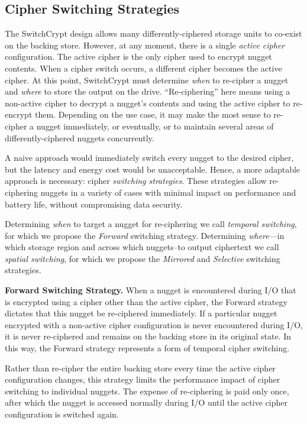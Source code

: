 \subsection{Cipher Switching Strategies} \label{subsec:strategies}

The SwitchCrypt design allows many differently-ciphered storage units to
co-exist on the backing store. However, at any moment, there is a single
\emph{active cipher} configuration. The active cipher is the only cipher used to
encrypt nugget contents. When a cipher switch occurs, a different cipher becomes
the active cipher. At this point, SwitchCrypt must determine \emph{when} to
re-cipher a nugget and \emph{where} to store the output on the drive.
``Re-ciphering'' here means using a non-active cipher to decrypt a nugget's
contents and using the active cipher to re-encrypt them. Depending on the use
case, it may make the most sense to re-cipher a nugget immediately, or
eventually, or to maintain several areas of differently-ciphered nuggets
concurrently.

A naive approach would immediately switch every nugget to the desired cipher,
but the latency and energy cost would be unacceptable. Hence, a more adaptable
approach is necessary: cipher \emph{switching strategies}. These strategies
allow re-ciphering nuggets in a variety of cases with minimal impact on
performance and battery life, without compromising data security.

Determining \emph{when} to target a nugget for re-ciphering we call
\emph{temporal switching}, for which we propose the \emph{Forward} switching
strategy. Determining \emph{where}---in which storage region and across which
nuggets--to output ciphertext we call \emph{spatial switching}, for which we
propose the \emph{Mirrored} and \emph{Selective} switching strategies.

\textbf{Forward Switching Strategy.} When a nugget is encountered during I/O
that is encrypted using a cipher other than the active cipher, the Forward
strategy dictates that this nugget be re-ciphered immediately. If a particular
nugget encrypted with a non-active cipher configuration is never encountered
during I/O, it is never re-ciphered and remains on the backing store in its
original state. In this way, the Forward strategy represents a form of temporal
cipher switching.

Rather than re-cipher the entire backing store every time the active cipher
configuration changes, this strategy limits the performance impact of cipher
switching to individual nuggets. The expense of re-ciphering is paid only once,
after which the nugget is accessed normally during I/O until the active cipher
configuration is switched again.

